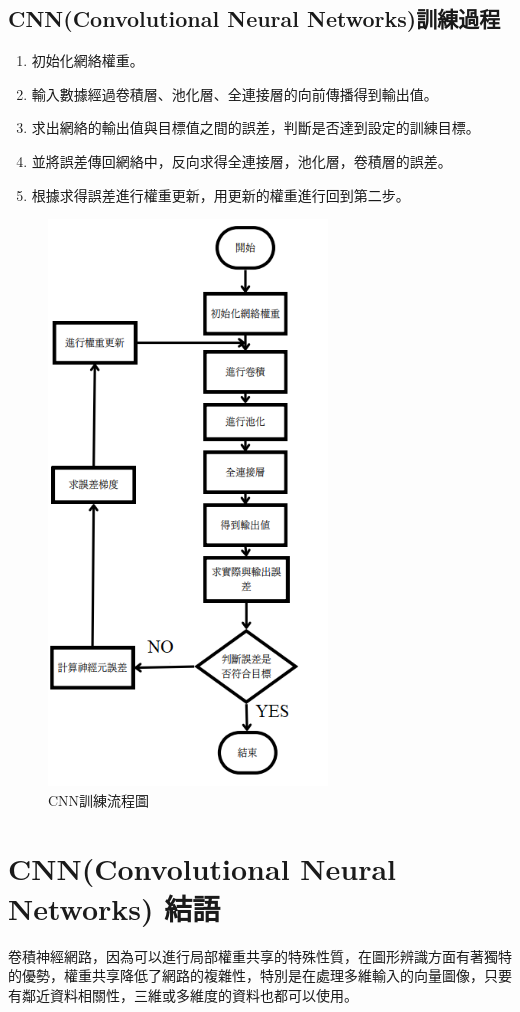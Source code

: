 \subsection{CNN(Convolutional Neural Networks)訓練過程}
\begin{enumerate}
	\item
	      初始化網絡權重。
	\item
	      輸入數據經過卷積層、池化層、全連接層的向前傳播得到輸出值。
	\item
	      求出網絡的輸出值與目標值之間的誤差，判斷是否達到設定的訓練目標。
	\item
	      並將誤差傳回網絡中，反向求得全連接層，池化層，卷積層的誤差。
	\item
	      根據求得誤差進行權重更新，用更新的權重進行回到第二步。
\end{enumerate}
\begin{figure}[H]
	\centerline{\includegraphics[height=15cm]{pic/CNNp.PNG}}
	\caption{CNN訓練流程圖}
	\label{fig:CNNTrainningFlowChart}
\end{figure}
\section{CNN(Convolutional Neural Networks) 結語}
卷積神經網路，因為可以進行局部權重共享的特殊性質，在圖形辨識方面有著獨特的優勢，權重共享降低了網路的複雜性，特別是在處理多維輸入的向量圖像，只要有鄰近資料相關性，三維或多維度的資料也都可以使用。
